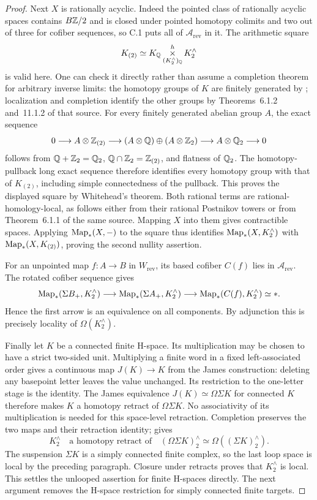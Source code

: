 \begin{proof}
Next $X$ is rationally acyclic. Indeed the pointed class of rationally acyclic spaces contains $B\mathbb Z/2$ and is closed under pointed homotopy colimits and two out of three for cofiber sequences, so C.1 puts all of $\mathcal A_{\mathrm{rev}}$ in it. The arithmetic square
\[
 K_{(2)}\simeq K_{\mathbb Q}\mathop{\times}\limits^h_{(K^{\wedge}_2)_{\mathbb Q}}K^{\wedge}_2
\]
is valid here. One can check it directly rather than assume a completion theorem for arbitrary inverse limits: the homotopy groups of $K$ are finitely generated by \cite[Theorem 4.5.2]{FGHMayPonto2012}; localization and completion identify the other groups by Theorems~6.1.2 and~11.1.2 of that source. For every finitely generated abelian group $A$, the exact sequence
\[
 0\longrightarrow A\otimes\mathbb Z_{(2)}\longrightarrow
 (A\otimes\mathbb Q)\oplus(A\otimes\mathbb Z_2)\longrightarrow
 A\otimes\mathbb Q_2\longrightarrow0
\]
follows from $\mathbb Q+\mathbb Z_2=\mathbb Q_2$, $\mathbb Q\cap\mathbb Z_2=\mathbb Z_{(2)}$, and flatness of $\mathbb Q_2$. The homotopy-pullback long exact sequence therefore identifies every homotopy group with that of $K_{(2)}$, including simple connectedness of the pullback. This proves the displayed square by Whitehead's theorem. Both rational terms are rational-homology-local, as follows either from their rational Postnikov towers or from Theorem~6.1.1 of the same source. Mapping $X$ into them gives contractible spaces. Applying $\operatorname{Map}_*(X,-)$ to the square thus identifies $\operatorname{Map}_*(X,K^{\wedge}_2)$ with $\operatorname{Map}_*(X,K_{(2)})$, proving the second nullity assertion.

For an unpointed map $f:A\to B$ in $W_{\mathrm{rev}}$, its based cofiber $C(f)$ lies in $\mathcal A_{\mathrm{rev}}$. The rotated cofiber sequence gives
\[
 \operatorname{Map}_*(\Sigma B_+,K^{\wedge}_2)\longrightarrow
 \operatorname{Map}_*(\Sigma A_+,K^{\wedge}_2)\longrightarrow
 \operatorname{Map}_*(C(f),K^{\wedge}_2)\simeq *.
\]
Hence the first arrow is an equivalence on all components. By adjunction this is precisely locality of $\Omega(K^{\wedge}_2)$.

Finally let $K$ be a connected finite H-space. Its multiplication may be chosen to have a strict two-sided unit. Multiplying a finite word in a fixed left-associated order gives a continuous map $J(K)\to K$ from the James construction: deleting any basepoint letter leaves the value unchanged. Its restriction to the one-letter stage is the identity. The James equivalence $J(K)\simeq\Omega\Sigma K$ for connected $K$ therefore makes $K$ a homotopy retract of $\Omega\Sigma K$. No associativity of its multiplication is needed for this space-level retraction. Completion preserves the two maps and their retraction identity; \cite[Proposition 11.2.4]{FGHMayPonto2012} gives
\[
 K^{\wedge}_2\quad\text{a homotopy retract of}\quad
 (\Omega\Sigma K)^{\wedge}_2\simeq\Omega((\Sigma K)^{\wedge}_2).
\]
The suspension $\Sigma K$ is a simply connected finite complex, so the last loop space is local by the preceding paragraph. Closure under retracts proves that $K^{\wedge}_2$ is local. This settles the unlooped assertion for finite H-spaces directly. The next argument removes the H-space restriction for simply connected finite targets.
\end{proof}

